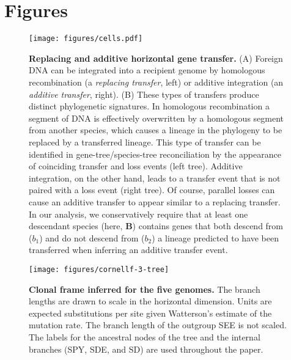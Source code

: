 \documentclass[12pt]{article}
\begin{document}
\section*{Figures}

\begin{figure}[!ht]
\begin{center}
\texttt{[image: figures/cells.pdf]}
\end{center}
\caption{ {\bf Replacing and additive horizontal gene transfer.}  (A)
  Foreign DNA can be integrated into a recipient genome by homologous
  recombination (a {\em replacing transfer}, left) or additive integration
  (an {\em additive transfer}, right). (B) These types of transfers produce
  distinct phylogenetic signatures.  In homologous recombination a segment
  of DNA is effectively overwritten by a homologous segment from another
  species, which causes a lineage in the phylogeny to be replaced by a
  transferred lineage.  This type of transfer can be identified in
  gene-tree/species-tree reconciliation by the appearance of coinciding
  transfer and loss events (left tree).  Additive integration, on the other
  hand, leads to a transfer event that is not paired with a loss event
  (right tree).  Of course, parallel losses can cause an additive transfer
  to appear similar to a replacing transfer.  In our analysis, we
  conservatively require that at least one descendant species (here, {\bf
    B}) contains genes that both descend from ($b_1$) and do not descend
  from ($b_2$) a lineage predicted to have been transferred when
  inferring an additive transfer event.}
\label{fig:hgt}
\end{figure}
\clearpage{}%

\begin{figure}[!ht]
\noindent \begin{centering}
\texttt{[image: figures/cornellf-3-tree]}
\par\end{centering}
\caption{
{\bf Clonal frame inferred for the five genomes.}  The branch lengths are
drawn to scale in the horizontal dimension.  Units are 
expected substitutions per site given Watterson's estimate of the
mutation rate. The branch length of the outgroup SEE is not scaled. 
The labels for the ancestral nodes of the tree and the
internal branches (SPY, SDE, and SD) are used throughout the paper.}
\label{fig:tree5}
\end{figure}
\clearpage{}%
\end{document}

